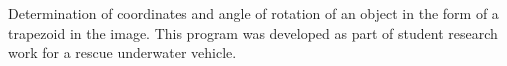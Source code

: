Determination of coordinates and angle of rotation of an object in the form of a trapezoid in the image. This program was developed as part of student research work for a rescue underwater vehicle. 